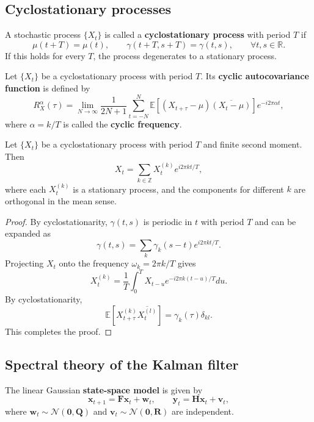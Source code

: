 \subsection{Cyclostationary processes}

\begin{definition}\label{def:cyclostationary_strict}
A stochastic process $\{X_t\}$ is called a \textbf{cyclostationary process} with period $T$ if
\[
\mu(t+T)=\mu(t),\qquad \gamma(t+T,s+T)=\gamma(t,s),\qquad \forall t,s\in\mathbb R.
\]
If this holds for every $T$, the process degenerates to a stationary process.
\end{definition}

\begin{definition}\label{def:cyclic_autocovariance}
Let $\{X_t\}$ be a cyclostationary process with period $T$. Its \textbf{cyclic autocovariance function} is defined by
\[
R_X^\alpha(\tau)=\lim_{N\to\infty}\frac1{2N+1}\sum_{t=-N}^{N}\mathbb E[(X_{t+\tau}-\mu)\overline{(X_t-\mu)}]e^{-i2\pi\alpha t},
\]
where $\alpha=k/T$ is called the \textbf{cyclic frequency}.
\end{definition}

\begin{theorem}\label{thm:cyclostationary_spectral_decomposition}
Let $\{X_t\}$ be a cyclostationary process with period $T$ and finite second moment. Then
\[
X_t=\sum_{k\in\mathbb Z}X_t^{(k)}e^{i2\pi kt/T},
\]
where each $X_t^{(k)}$ is a stationary process, and the components for different $k$ are orthogonal in the mean sense.
\end{theorem}

\begin{proof}
By cyclostationarity, $\gamma(t,s)$ is periodic in $t$ with period $T$ and can be expanded as
\[
\gamma(t,s)=\sum_k\gamma_k(s-t)e^{i2\pi kt/T}.
\]
Projecting $X_t$ onto the frequency $\omega_k=2\pi k/T$ gives
\[
X_t^{(k)}=\frac1T\int_0^TX_{t-u}e^{-i2\pi k(t-u)/T}du.
\]
By cyclostationarity,
\[
\mathbb E[X_{t+\tau}^{(k)}\overline{X_t^{(l)}}]=\gamma_k(\tau)\delta_{kl}.
\]
This completes the proof.
\end{proof}

\subsection{Spectral theory of the Kalman filter}

\begin{definition}\label{def:state_space_model}
The linear Gaussian \textbf{state-space model} is given by
\[
\mathbf x_{t+1}=\mathbf F\mathbf x_t+\mathbf w_t,\qquad
\mathbf y_t=\mathbf H\mathbf x_t+\mathbf v_t,
\]
where $\mathbf w_t\sim\mathcal N(\mathbf 0,\mathbf Q)$ and $\mathbf v_t\sim\mathcal N(\mathbf 0,\mathbf R)$ are independent.
\end{definition}

